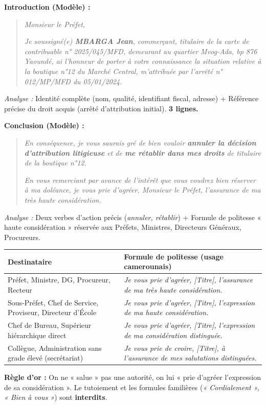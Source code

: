 \documentclass[11pt]{article}
\begin{document}
\begin{exemplebox}
\textbf{Introduction (Modèle) :}
\begin{quote}
\textit{Monsieur le Préfet,}\par
\textit{Je soussigné(e) \textbf{MBARGA Jean}, commerçant, titulaire de la carte de contribuable n° 2025/045/MFD, demeurant au quartier Mvog-Ada, bp 876 Yaoundé, ai l'honneur de porter à votre connaissance la situation relative à la boutique n°12 du Marché Central, m'attribuée par l'arrêté n° 012/MP/MFD du 05/01/2024.}
\end{quote}
\textit{Analyse :} Identité complète (nom, qualité, identifiant fiscal, adresse) + Référence précise du droit acquis (arrêté d'attribution initial). \textbf{3 lignes.}

\textbf{Conclusion (Modèle) :}
\begin{quote}
\textit{En conséquence, je vous saurais gré de bien vouloir \textbf{annuler la décision d'attribution litigieuse} et de \textbf{me rétablir dans mes droits} de titulaire de la boutique n°12.}\par
\textit{En vous remerciant par avance de l'intérêt que vous voudrez bien réserver à ma doléance, je vous prie d'agréer, Monsieur le Préfet, l'assurance de ma très haute considération.}
\end{quote}
\textit{Analyse :} Deux verbes d'action précis (\emph{annuler, rétablir}) + Formule de politesse « haute considération » réservée aux Préfets, Ministres, Directeurs Généraux, Procureurs.
\end{exemplebox}

\begin{aretenir}
\begin{center}
\begin{tabularx}{\linewidth}{|l|X|}\hline
\textbf{Destinataire} & \textbf{Formule de politesse (usage camerounais)} \\ \hline
Préfet, Ministre, DG, Procureur, Recteur & \emph{Je vous prie d'agréer, [Titre], l'assurance de ma très haute considération.} \\ \hline
Sous-Préfet, Chef de Service, Proviseur, Directeur d'École & \emph{Je vous prie d'agréer, [Titre], l'expression de ma haute considération.} \\ \hline
Chef de Bureau, Supérieur hiérarchique direct & \emph{Je vous prie d'agréer, [Titre], l'expression de ma considération distinguée.} \\ \hline
Collègue, Administration sans grade élevé (secrétariat) & \emph{Je vous prie de croire, [Titre], à l'assurance de mes salutations distinguées.} \\ \hline
\end{tabularx}
\end{center}
\textbf{Règle d'or :} On ne « salue » pas une autorité, on lui « prie d'agréer l'expression de sa considération ». Le tutoiement et les formules familières (\emph{« Cordialement », « Bien à vous »}) sont \textbf{interdits}.
\end{aretenir}
\end{document}
